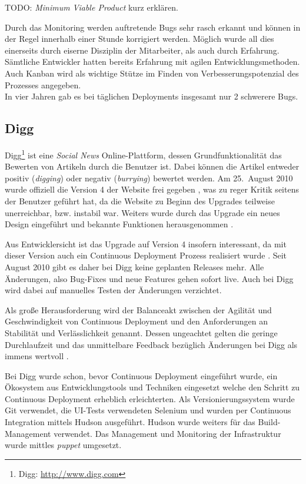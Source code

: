 \begin{wichtigbox}
TODO: \emph{Minimum Viable Product} kurz erklären.
\end{wichtigbox}

Durch das Monitoring werden auftretende Bugs sehr rasch erkannt und können in
der Regel innerhalb einer Stunde korrigiert werden. Möglich wurde all dies
einerseits durch eiserne Disziplin der Mitarbeiter, als auch durch Erfahrung.
Sämtliche Entwickler hatten bereits Erfahrung mit agilen Entwicklungsmethoden.
Auch Kanban wird als wichtige Stütze im Finden von Verbesserungspotenzial des
Prozesses angegeben.\\
In vier Jahren gab es bei täglichen Deployments insgesamt nur 2 schwerere
Bugs.


\subsection{Digg}

Digg\footnote{Digg: \url{http://www.digg.com}} ist eine \emph{Social News}
Online-Plattform, dessen Grundfunktionalität das Bewerten von Artikeln durch
die Benutzer ist. Dabei können die Artikel entweder positiv (\emph{digging})
oder negativ (\emph{burrying}) bewertet werden. Am 25.~August 2010 wurde
offiziell die Version 4 der Website frei gegeben \cite{digg4-launch}, was zu
reger Kritik seitens der Benutzer geführt hat, da die Website zu Beginn des
Upgrades teilweise unerreichbar, bzw. instabil war. Weiters wurde durch das
Upgrade ein neues Design eingeführt und bekannte Funktionen herausgenommen
\cite{digg4-critics}.

Aus Entwicklersicht ist das Upgrade auf Version 4 insofern interessant, da mit
dieser Version auch ein Continuous Deployment Prozess realisiert wurde
\cite{digg4}. Seit August 2010 gibt es daher bei Digg keine geplanten Releases
mehr. Alle Änderungen, also Bug-Fixes und neue Features gehen sofort live.
Auch bei Digg wird dabei auf manuelles Testen der Änderungen verzichtet.

Als große Herausforderung wird der Balanceakt zwischen der Agilität und
Geschwindigkeit von Continuous Deployment und den Anforderungen an Stabilität
und Verlässlichkeit genannt. Dessen ungeachtet gelten die geringe
Durchlaufzeit und das unmittelbare Feedback bezüglich Änderungen bei Digg als
immens wertvoll \cite{digg4}.

 Bei Digg wurde schon, bevor Continuous Deployment
eingeführt wurde, ein Ökosystem aus Entwicklungstools und Techniken eingesetzt
welche den Schritt zu Continuous Deployment erheblich erleichterten. Als
Versionierungssystem wurde Git verwendet, die UI-Tests verwendeten Selenium
und wurden per Continuous Integration mittels Hudson ausgeführt. Hudson wurde
weiters für das Build-Management verwendet. Das Management und Monitoring der
Infrastruktur wurde mittles \emph{puppet} umgesetzt.

